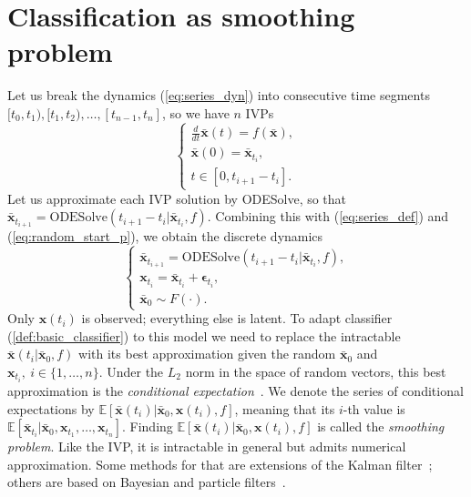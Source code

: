 \documentclass[referee, pdflatex, sn-mathphys-num]{sn-jnl}
\theoremstyle{definition}
\theoremstyle{plain}
\newcommand{\bx}{\ensuremath{\mathbf{x}}}
\newcommand{\bbx}{\ensuremath{\bar{\mathbf{x}}}}
\newcommand{\beps}{\ensuremath{\boldsymbol{\epsilon}}}
\begin{document}
	\section{Classification as smoothing problem}
	
	Let us break the dynamics (\ref{eq:series_dyn}) into consecutive time segments $[t_0, t_1), [t_1, t_2), \ldots, [t_{n-1}, t_n]$, so we have $n$ IVPs
	\begin{equation}
		\begin{cases}\label{eq:seg_series_dyn}
			\frac{d}{dt} \bbx(t) = f(\bbx), \\
			\bbx(0) = \bbx_{t_i}, \\
			t \in [0, t_{i+1} - t_i].
		\end{cases}
	\end{equation}
	Let us approximate each IVP solution by ODESolve, so that $\bbx_{t_{i+1}} = \text{ODESolve}(t_{i+1} - t_i | \bbx_{t_i}, f)$. Combining this with (\ref{eq:series_def}) and (\ref{eq:random_start_p}), we obtain the discrete dynamics
	\begin{equation}\label{eq:smooth}
		\begin{cases}
			\bbx_{t_{i+1}} = \text{ODESolve}(t_{i+1} - t_i | \bbx_{t_i}, f), \\
			\bx_{t_i} = \bbx_{t_i} + \beps_{t_i}, \\
			\bbx_0 \sim F(\cdot).
		\end{cases}
	\end{equation}
	Only $\bx(t_i)$ is observed; everything else is latent. To adapt classifier (\ref{def:basic_classifier}) to this model we need to replace the intractable $\bbx(t_i | \bbx_0, f)$ with its best approximation given the random $\bbx_0$ and $\bx_{t_i}, \ i \in \{1, \ldots, n\}$. Under the $L_2$ norm in the space of random vectors, this best approximation is the \emph{conditional expectation}~\cite{hogg2005introduction}. We denote the series of conditional expectations by $\mathbb{E}[\bbx(t_i) | \bbx_0, \bx(t_i), f]$, meaning that its $i$-th value is $\mathbb{E}[\bbx_{t_i} | \bbx_0, \bx_{t_1}, \ldots, \bx_{t_n}]$. Finding $\mathbb{E}[\bbx(t_i) | \bbx_0, \bx(t_i), f]$ is called the \emph{smoothing problem}. Like the IVP, it is intractable in general but admits numerical approximation. Some methods for that are extensions of the Kalman filter~\cite{ekf_book, Julier1997NewEO}; others are based on Bayesian and particle filters~\cite{bayes_filter_smooth}.
	
\end{document}

